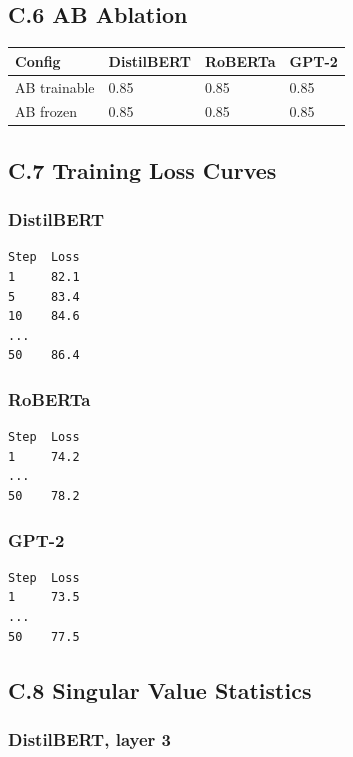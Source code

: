 \subsection{C.6 AB Ablation}

\begin{table}[H]
\centering
\small
\begin{tabular}{llll}
\toprule
\textbf{Config} & \textbf{DistilBERT} & \textbf{RoBERTa} & \textbf{GPT-2} \\
\midrule
AB trainable & 0.85 & 0.85 & 0.85 \\
AB frozen & 0.85 & 0.85 & 0.85 \\
\bottomrule
\end{tabular}
\end{table}

\subsection{C.7 Training Loss Curves}

\subsubsection{DistilBERT}

\begin{lstlisting}
Step  Loss
1     82.1
5     83.4
10    84.6
...
50    86.4
\end{lstlisting}

\subsubsection{RoBERTa}

\begin{lstlisting}
Step  Loss
1     74.2
...
50    78.2
\end{lstlisting}

\subsubsection{GPT-2}

\begin{lstlisting}
Step  Loss
1     73.5
...
50    77.5
\end{lstlisting}

\subsection{C.8 Singular Value Statistics}

\subsubsection{DistilBERT, layer 3}

